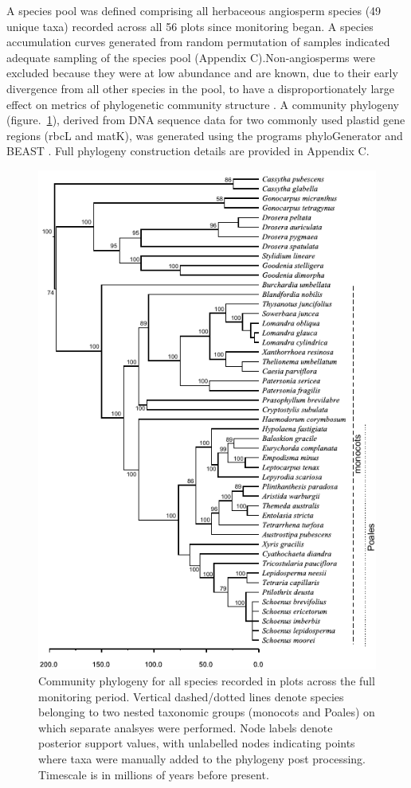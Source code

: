 A species pool was defined comprising all herbaceous angiosperm species (49 unique taxa) recorded across all 56 plots since monitoring began. A species accumulation curves generated from random permutation of samples indicated adequate sampling of the species pool (Appendix C).Non-angiosperms were excluded because they were at low abundance and are known, due to their early divergence from all other species in the pool, to have a disproportionately large effect on metrics of phylogenetic community structure \citep{Kembel2006}. A community phylogeny (figure.~\ref{phylog}), derived from DNA sequence data for two commonly used plastid gene regions (rbcL and matK), was generated using the programs phyloGenerator \citep{Pearse2013} and BEAST \citep{Drummond2007}. Full phylogeny construction details are provided in Appendix C.

 \begin{figure}[H]
 \centering
 \includegraphics[width=0.9\linewidth]{Chapter4/Figs/phylog_long.pdf}
 \caption{\footnotesize Community phylogeny for all species recorded in plots across the full monitoring period. Vertical dashed/dotted lines denote species belonging to two nested taxonomic groups (monocots and Poales) on which separate analsyes were performed. Node labels denote posterior support values, with unlabelled nodes indicating points where taxa were manually added to the phylogeny post processing. Timescale is in millions of years before present.}
 \label{phylog}
 \end{figure}


